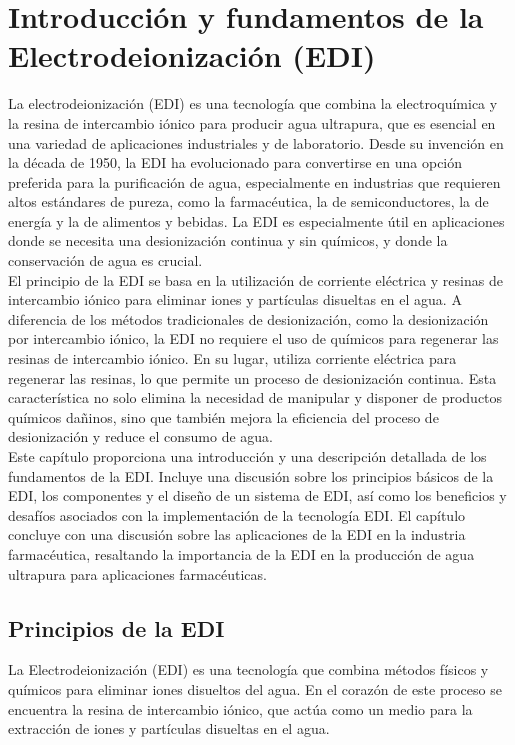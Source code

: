 \chapter{Introducción y fundamentos de la Electrodeionización (EDI)}
La electrodeionización (EDI) es una tecnología que combina la electroquímica y la resina de intercambio iónico para producir agua ultrapura, que es esencial en una variedad de aplicaciones industriales y de laboratorio. Desde su invención en la década de 1950, la EDI ha evolucionado para convertirse en una opción preferida para la purificación de agua, especialmente en industrias que requieren altos estándares de pureza, como la farmacéutica, la de semiconductores, la de energía y la de alimentos y bebidas. La EDI es especialmente útil en aplicaciones donde se necesita una desionización continua y sin químicos, y donde la conservación de agua es crucial. \\

El principio de la EDI se basa en la utilización de corriente eléctrica y resinas de intercambio iónico para eliminar iones y partículas disueltas en el agua. A diferencia de los métodos tradicionales de desionización, como la desionización por intercambio iónico, la EDI no requiere el uso de químicos para regenerar las resinas de intercambio iónico. En su lugar, utiliza corriente eléctrica para regenerar las resinas, lo que permite un proceso de desionización continua. Esta característica no solo elimina la necesidad de manipular y disponer de productos químicos dañinos, sino que también mejora la eficiencia del proceso de desionización y reduce el consumo de agua. \\

Este capítulo proporciona una introducción y una descripción detallada de los fundamentos de la EDI. Incluye una discusión sobre los principios básicos de la EDI, los componentes y el diseño de un sistema de EDI, así como los beneficios y desafíos asociados con la implementación de la tecnología EDI. El capítulo concluye con una discusión sobre las aplicaciones de la EDI en la industria farmacéutica, resaltando la importancia de la EDI en la producción de agua ultrapura para aplicaciones farmacéuticas. \\

\section{Principios de la EDI}
La Electrodeionización (EDI) es una tecnología que combina métodos físicos y químicos para eliminar iones disueltos del agua. En el corazón de este proceso se encuentra la resina de intercambio iónico, que actúa como un medio para la extracción de iones y partículas disueltas en el agua. \\

